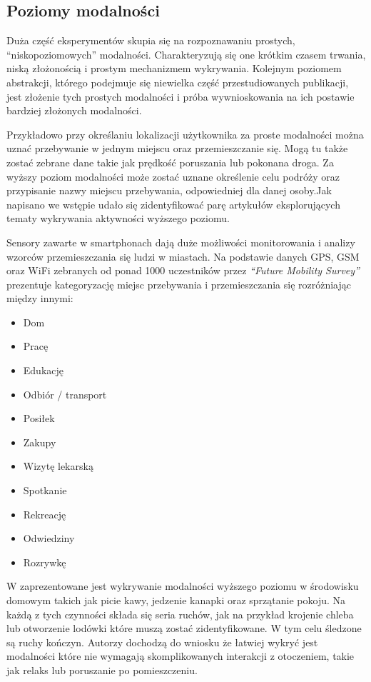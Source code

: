 \subsection{Poziomy modalności}
\label{sec:modality_levels}
Duża część eksperymentów skupia się na rozpoznawaniu prostych, ``niskopoziomowych'' modalności. Charakteryzują się one krótkim czasem trwania, niską złożonością i prostym mechanizmem wykrywania. Kolejnym poziomem abstrakcji, którego podejmuje się niewielka część przestudiowanych publikacji, jest złożenie tych prostych modalności i próba wywnioskowania na ich postawie bardziej złożonych modalności.

Przykładowo przy określaniu lokalizacji użytkownika za proste modalności można uznać przebywanie w jednym miejscu oraz przemieszczanie się. Mogą tu także zostać zebrane dane takie jak prędkość poruszania lub pokonana droga. Za wyższy poziom modalności może zostać uznane określenie celu podróży oraz przypisanie nazwy miejscu przebywania, odpowiedniej dla danej osoby.Jak napisano we wstępie udało się zidentyfikować parę artykułów eksplorujących tematy wykrywania aktywności wyższego poziomu.

Sensory zawarte w smartphonach dają duże możliwości monitorowania i analizy wzorców przemieszczania się ludzi w miastach. Na podstawie danych GPS, GSM oraz WiFi zebranych od ponad 1000 uczestników przez \textit{``Future Mobility Survey''} \cite{26_Mobility_Sensing} prezentuje kategoryzację miejsc przebywania i przemieszczania się rozróżniając między innymi:
\begin{itemize}
    \item Dom
    \item Pracę
    \item Edukację
    \item Odbiór / transport
    \item Posiłek
    \item Zakupy
    \item Wizytę lekarską
    \item Spotkanie
    \item Rekreację
    \item Odwiedziny
    \item Rozrywkę
\end{itemize}

W \cite{38_High_Lvl_HAR} zaprezentowane jest wykrywanie modalności wyższego poziomu w środowisku domowym takich jak picie kawy, jedzenie kanapki oraz sprzątanie pokoju. Na każdą z tych czynności składa się seria ruchów, jak na przykład krojenie chleba lub otworzenie lodówki które muszą zostać zidentyfikowane. W tym celu śledzone są ruchy kończyn. Autorzy dochodzą do wniosku że łatwiej wykryć jest modalności które nie wymagają skomplikowanych interakcji z otoczeniem, takie jak relaks lub poruszanie po pomieszczeniu.

